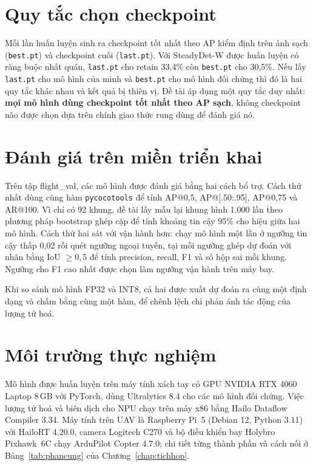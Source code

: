 \section{Quy tắc chọn checkpoint}

Mỗi lần huấn luyện sinh ra checkpoint tốt nhất theo AP kiểm định trên ảnh sạch (\texttt{best.pt}) và checkpoint cuối (\texttt{last.pt}). Với SteadyDet-W được huấn luyện có ràng buộc nhất quán, \texttt{last.pt} cho retain 33,4\% còn \texttt{best.pt} cho 30,5\%. Nếu lấy \texttt{last.pt} cho mô hình của mình và \texttt{best.pt} cho mô hình đối chứng thì đó là hai quy tắc khác nhau và kết quả bị thiên vị. Đề tài áp dụng một quy tắc duy nhất: \textbf{mọi mô hình dùng checkpoint tốt nhất theo AP sạch}, không checkpoint nào được chọn dựa trên chính giao thức rung dùng để đánh giá nó.

\section{Đánh giá trên miền triển khai}

Trên tập flight\_val, các mô hình được đánh giá bằng hai cách bổ trợ. Cách thứ nhất dùng cùng hàm \texttt{pycocotools} để tính AP@0,5, AP@[.50:.95], AP@0,75 và AR@100. Vì chỉ có 92 khung, đề tài lấy mẫu lại khung hình 1.000 lần theo phương pháp bootstrap ghép cặp để tính khoảng tin cậy 95\% cho hiệu giữa hai mô hình. Cách thứ hai sát với vận hành hơn: chạy mô hình một lần ở ngưỡng tin cậy thấp 0,02 rồi quét ngưỡng ngoại tuyến, tại mỗi ngưỡng ghép dự đoán với nhãn bằng IoU $\ge 0{,}5$ để tính precision, recall, F1 và số hộp sai mỗi khung. Ngưỡng cho F1 cao nhất được chọn làm ngưỡng vận hành trên máy bay.

Khi so sánh mô hình FP32 và INT8, cả hai được xuất dự đoán ra cùng một định dạng và chấm bằng cùng một hàm, để chênh lệch chỉ phản ánh tác động của lượng tử hoá.

\section{Môi trường thực nghiệm}

Mô hình được huấn luyện trên máy tính xách tay có GPU NVIDIA RTX 4060 Laptop 8\,GB với PyTorch, dùng Ultralytics 8.4 cho các mô hình đối chứng. Việc lượng tử hoá và biên dịch cho NPU chạy trên máy x86 bằng Hailo Dataflow Compiler 3.34. Máy tính trên UAV là Raspberry Pi~5 (Debian 12, Python 3.11) với HailoRT 4.20.0, camera Logitech C270 và bộ điều khiển bay Holybro Pixhawk~6C chạy ArduPilot Copter 4.7.0; chi tiết từng thành phần và cách nối ở Bảng~\ref{tab:phancung} của Chương~\ref{chap:tichhop}.

